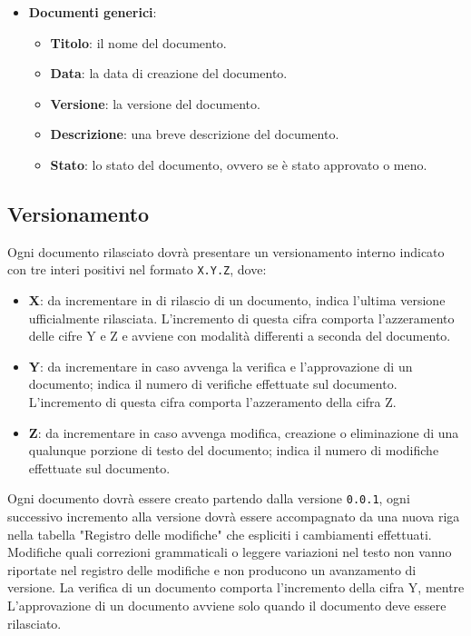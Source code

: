 \begin{itemize}
	\item \textbf{Documenti generici}:
	      \begin{itemize}
		      \item \textbf{Titolo}: il nome del documento.
		      \item \textbf{Data}: la data di creazione del documento.
		      \item \textbf{Versione}: la versione del documento.
		      \item \textbf{Descrizione}: una breve descrizione del documento.
		      \item \textbf{Stato}: lo stato del documento, ovvero se è stato
		            approvato o meno.
	      \end{itemize}

\end{itemize}


\subsection{Versionamento}
\label{documentazione_versionamento}
Ogni documento rilasciato dovrà presentare un versionamento interno indicato con
tre interi positivi nel formato \texttt{X.Y.Z}, dove:
\begin{itemize}
	\item \textbf{X}: da incrementare in di rilascio di un
	      documento, indica l'ultima versione ufficialmente rilasciata.
	      L'incremento di questa cifra comporta l'azzeramento delle cifre Y e Z
	      e avviene con modalità differenti a seconda del documento.

	\item \textbf{Y}: da incrementare in caso avvenga la verifica e
	      l'approvazione di un documento; indica il numero di verifiche
	      effettuate sul documento. L'incremento di questa cifra comporta
	      l'azzeramento della cifra Z.

	\item \textbf{Z}: da incrementare in caso avvenga modifica, creazione o
	      eliminazione di una qualunque porzione di testo del documento; indica
	      il numero di modifiche effettuate sul documento.
\end{itemize}

Ogni documento dovrà essere creato partendo dalla versione \texttt{0.0.1}, ogni
successivo incremento alla versione dovrà essere accompagnato da una nuova riga
nella tabella "Registro delle modifiche" che espliciti i cambiamenti effettuati.
Modifiche quali correzioni grammaticali o leggere variazioni nel testo non vanno
riportate nel registro delle modifiche e non producono un avanzamento di
versione.
La verifica di un documento comporta l'incremento della cifra Y, mentre
L'approvazione di un documento avviene solo quando il documento deve essere
rilasciato.

